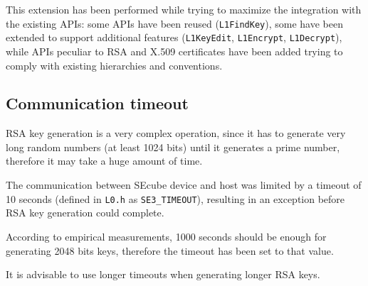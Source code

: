 This extension has been performed while trying to maximize the integration with
the existing APIs: some APIs have been reused (\texttt{L1FindKey}), some have
been extended to support additional features (\texttt{L1KeyEdit},
\texttt{L1Encrypt}, \texttt{L1Decrypt}), while APIs peculiar to RSA and X.509
certificates have been added trying to comply with existing hierarchies and
conventions.

\subsection{Communication timeout}
RSA key generation is a very complex operation, since it has to generate very
long random numbers (at least 1024 bits) until it generates a prime number,
therefore it may take a huge amount of time.

The communication between SEcube device and host was limited by a timeout of 10
seconds (defined in \texttt{L0.h} as \texttt{SE3\_TIMEOUT}), resulting in an
exception before RSA key generation could complete.

\bigskip
According to empirical measurements, 1000 seconds should be enough for
generating 2048 bits keys, therefore the timeout has been set to that value.

It is advisable to use longer timeouts when generating longer RSA keys.

